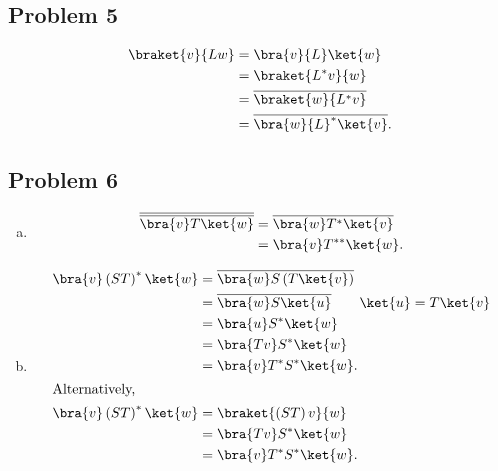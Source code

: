 \documentclass[10pt]{mypackage}
\begin{document}
\subsection{Problem 5}%
\begin{align*}
  \braket{v}{{L}w} &= \bra{v}{L}\ket{w}\\
                           &= \braket{{L}^{\ast}v}{w}\\
                           &= \overline{\braket{w}{{L}^{\ast}v}}\\
                           &= \overline{\bra{w}{L}^{\ast}\ket{v}}.
\end{align*}
\subsection{Problem 6}%
\begin{enumerate}[(a)]
  \item 
      \begin{align*}
        \overline{\overline{\bra{v}T\ket{w}}} &= \overline{\bra{w}T^{\ast}\ket{v}}\\
                                              &= \bra{v}T^{\ast\ast}\ket{w}.
      \end{align*}
  \item 
    \begin{align*}
      \bra{v}\left(ST\right)^{\ast}\ket{w} &= \overline{\bra{w}S\left(T\ket{v}\right)}\\
                                           &= \overline{\bra{w}S\ket{u}}\tag*{$\ket{u} = T\ket{v}$}\\
                                           &= \bra{u}S^{\ast}\ket{w}\\
                                           &= \bra{Tv}S^{\ast}\ket{w}\\
                                           &= \bra{v}T^{\ast}S^{\ast}\ket{w}.\\
                                           \intertext{Alternatively,}
      \bra{v}\left(ST\right)^{\ast}\ket{w} &= \braket{\left(ST\right)v}{w}\\
                                           &= \bra{Tv}S^{\ast}\ket{w}\\
                                           &= \bra{v}T^{\ast}S^{\ast}\ket{w}.
    \end{align*}
\end{enumerate}
\end{document}
